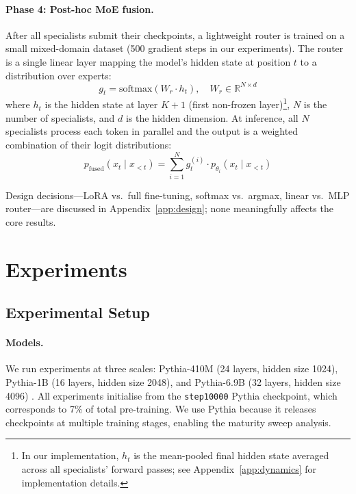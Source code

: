 \documentclass{article}
\begin{document}
\paragraph{Phase 4: Post-hoc MoE fusion.} After all specialists submit their checkpoints, a lightweight router is trained on a small mixed-domain dataset (500 gradient steps in our experiments). The router is a single linear layer mapping the model's hidden state at position $t$ to a distribution over experts:
\[
g_t = \mathrm{softmax}\left(W_r \cdot h_t\right), \quad W_r \in \mathbb{R}^{N \times d}
\]
where $h_t$ is the hidden state at layer $K+1$ (first non-frozen layer)\footnote{In our implementation, $h_t$ is the mean-pooled final hidden state averaged across all specialists' forward passes; see Appendix~\ref{app:dynamics} for implementation details.}, $N$ is the number of specialists, and $d$ is the hidden dimension. At inference, all $N$ specialists process each token in parallel and the output is a weighted combination of their logit distributions:
\[
p_\text{fused}(x_t \mid x_{<t}) = \sum_{i=1}^{N} g_t^{(i)} \cdot p_{\theta_i}(x_t \mid x_{<t})
\]

Design decisions---LoRA vs.\ full fine-tuning, softmax vs.\ argmax, linear vs.\ MLP router---are discussed in Appendix~\ref{app:design}; none meaningfully affects the core results.

\section{Experiments}
\label{sec:experiments}

\subsection{Experimental Setup}
\label{sec:setup}

\paragraph{Models.} We run experiments at three scales: Pythia-410M (24 layers, hidden size 1024), Pythia-1B (16 layers, hidden size 2048), and Pythia-6.9B (32 layers, hidden size 4096) \citep{biderman2023pythia}. All experiments initialise from the \texttt{step10000} Pythia checkpoint, which corresponds to 7\% of total pre-training. We use Pythia because it releases checkpoints at multiple training stages, enabling the maturity sweep analysis.
\end{document}
